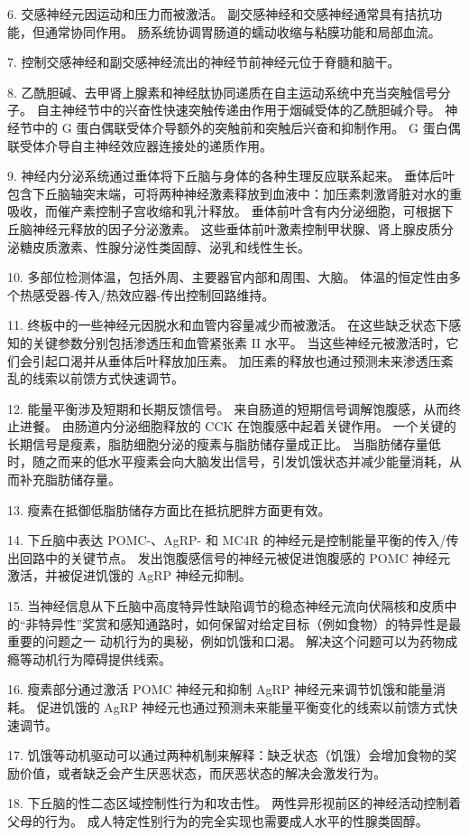 6. 交感神经元因运动和压力而被激活。 副交感神经和交感神经通常具有拮抗功能，但通常协同作用。 肠系统协调胃肠道的蠕动收缩与粘膜功能和局部血流。 

7. 控制交感神经和副交感神经流出的神经节前神经元位于脊髓和脑干。 

8. 乙酰胆碱、去甲肾上腺素和神经肽协同递质在自主运动系统中充当突触信号分子。 自主神经节中的兴奋性快速突触传递由作用于烟碱受体的乙酰胆碱介导。 神经节中的 G 蛋白偶联受体介导额外的突触前和突触后兴奋和抑制作用。 G 蛋白偶联受体介导自主神经效应器连接处的递质作用。 

9. 神经内分泌系统通过垂体将下丘脑与身体的各种生理反应联系起来。 垂体后叶包含下丘脑轴突末端，可将两种神经激素释放到血液中：加压素刺激肾脏对水的重吸收，而催产素控制子宫收缩和乳汁释放。 垂体前叶含有内分泌细胞，可根据下丘脑神经元释放的因子分泌激素。 这些垂体前叶激素控制甲状腺、肾上腺皮质分泌糖皮质激素、性腺分泌性类固醇、泌乳和线性生长。

10. 多部位检测体温，包括外周、主要器官内部和周围、大脑。 体温的恒定性由多个热感受器-传入/热效应器-传出控制回路维持。 

11. 终板中的一些神经元因脱水和血管内容量减少而被激活。 在这些缺乏状态下感知的关键参数分别包括渗透压和血管紧张素 II 水平。 当这些神经元被激活时，它们会引起口渴并从垂体后叶释放加压素。 加压素的释放也通过预测未来渗透压紊乱的线索以前馈方式快速调节。 

12. 能量平衡涉及短期和长期反馈信号。 来自肠道的短期信号调解饱腹感，从而终止进餐。 由肠道内分泌细胞释放的 CCK 在饱腹感中起着关键作用。 一个关键的长期信号是瘦素，脂肪细胞分泌的瘦素与脂肪储存量成正比。 当脂肪储存量低时，随之而来的低水平瘦素会向大脑发出信号，引发饥饿状态并减少能量消耗，从而补充脂肪储存量。 

13. 瘦素在抵御低脂肪储存方面比在抵抗肥胖方面更有效。 

14. 下丘脑中表达 POMC-、AgRP- 和 MC4R 的神经元是控制能量平衡的传入/传出回路中的关键节点。 发出饱腹感信号的神经元被促进饱腹感的 POMC 神经元激活，并被促进饥饿的 AgRP 神经元抑制。 

15. 当神经信息从下丘脑中高度特异性缺陷调节的稳态神经元流向伏隔核和皮质中的“非特异性”奖赏和感知通路时，如何保留对给定目标（例如食物）的特异性是最重要的问题之一 动机行为的奥秘，例如饥饿和口渴。 解决这个问题可以为药物成瘾等动机行为障碍提供线索。 

16. 瘦素部分通过激活 POMC 神经元和抑制 AgRP 神经元来调节饥饿和能量消耗。 促进饥饿的 AgRP 神经元也通过预测未来能量平衡变化的线索以前馈方式快速调节。 

17. 饥饿等动机驱动可以通过两种机制来解释：缺乏状态（饥饿）会增加食物的奖励价值，或者缺乏会产生厌恶状态，而厌恶状态的解决会激发行为。 

18. 下丘脑的性二态区域控制性行为和攻击性。 两性异形视前区的神经活动控制着父母的行为。 成人特定性别行为的完全实现也需要成人水平的性腺类固醇。


